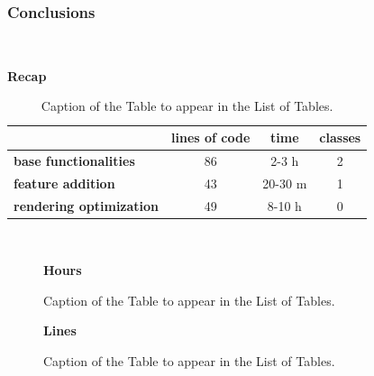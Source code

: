 \subsubsection{Conclusions} \mbox{} \\
\label{subpar:render_optimizations_inherited_widget}
\begin{table}[H]
    \caption*{\textbf{Recap}}
    \centering 
    \begin{tabular}{| l | c |c| c |}
    \hline
    \rowcolor{bluepoli!40} %
     & \textbf{lines of code} & \textbf{time} & \textbf{classes} \T\B \\
     \hline
    \textbf{base functionalities} & 86 & 2-3 h & 2 \T\B \\ 
    \textbf{feature addition} & 43 & 20-30 m & 1 \T\B\\ 
    \textbf{rendering optimization} & 49 & 8-10 h & 0 \B\\
    \hline
    \end{tabular}
    \\[10pt]
    \caption{Caption of the Table to appear in the List of Tables.}
    \label{table:example}
\end{table}

\begin{figure}[H]
 \caption*{\textbf{Hours}}
\centering
{}
 \caption{Caption of the Table to appear in the List of Tables.}
\end{figure}
\begin{figure}[H]

\caption*{\textbf{Lines}}
\centering
{}
 \caption{Caption of the Table to appear in the List of Tables.}
\end{figure}